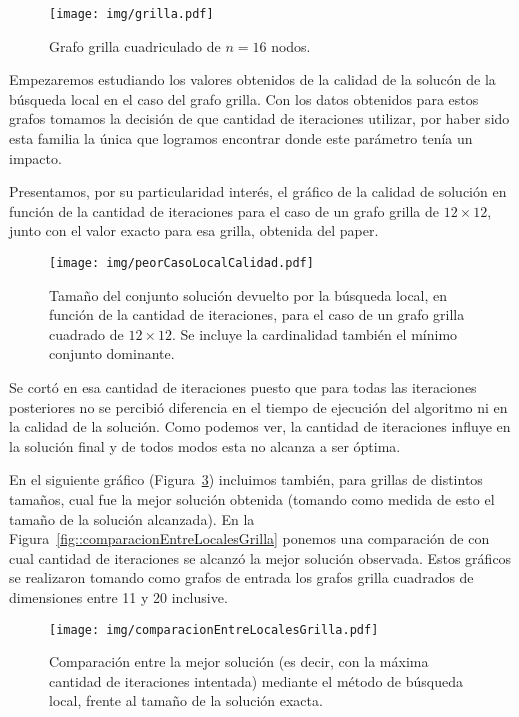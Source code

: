 \begin{figure}[H]
	\caption{Grafo grilla cuadriculado de $n = 16$ nodos.}
	\label{fig::grilla}
	\centering
	\texttt{[image: img/grilla.pdf]}
\end{figure} 

Empezaremos estudiando los valores obtenidos de la calidad de la 
soluc\'on de la b\'usqueda local en el caso del grafo grilla. 
Con los datos obtenidos para estos grafos tomamos la decisi\'on de que
cantidad de iteraciones utilizar, por haber sido esta familia la
\'unica que logramos encontrar donde este par\'ametro ten\'ia un 
impacto.

Presentamos, por su particularidad inter\'es, el gr\'afico de la calidad
de soluci\'on en funci\'on de la cantidad de iteraciones para el caso de
un grafo grilla de $12 \times 12$, junto con el valor exacto para esa 
grilla, obtenida del paper. 

\begin{figure}[H]
	\caption{Tama\~no del conjunto soluci\'on devuelto por la b\'usqueda
	local, en funci\'on de la cantidad de iteraciones, para el caso de
	un grafo grilla cuadrado de $12 \times 12$. Se incluye la 
	cardinalidad tambi\'en el m\'inimo conjunto dominante.}
	\label{fig::peorCasoCalidadLocal}
	\centering
	\texttt{[image: img/peorCasoLocalCalidad.pdf]}
\end{figure} 

Se cort\'o en esa cantidad de iteraciones puesto que para todas las
iteraciones posteriores no se percibi\'o diferencia en el tiempo de
ejecuci\'on del algoritmo ni en la calidad de la soluci\'on. Como 
podemos ver, la cantidad de iteraciones influye en la soluci\'on final y
de todos modos esta no alcanza a ser \'optima.

En el siguiente gr\'afico (Figura~\ref{fig::comparacionMejorLocalGrilla})
incluimos tambi\'en, para grillas de distintos tama\~nos, cual fue la 
mejor soluci\'on obtenida (tomando como medida de esto el tama\~no de 
la soluci\'on alcanzada). En la Figura~\ref{fig::comparacionEntreLocalesGrilla}
ponemos una comparaci\'on de con cual cantidad de iteraciones se 
alcanz\'o la mejor soluci\'on observada. Estos gr\'aficos se realizaron
tomando como grafos de entrada los grafos grilla cuadrados de 
dimensiones entre 11 y 20 inclusive.

\begin{figure}[H]
	\caption{Comparaci\'on entre la mejor soluci\'on (es decir, con la 
	m\'axima cantidad de iteraciones intentada) mediante el m\'etodo de
	b\'usqueda local, frente al tama\~no de la soluci\'on exacta.}
	\label{fig::comparacionMejorLocalGrilla}
	\centering
	\texttt{[image: img/comparacionEntreLocalesGrilla.pdf]}
\end{figure}

